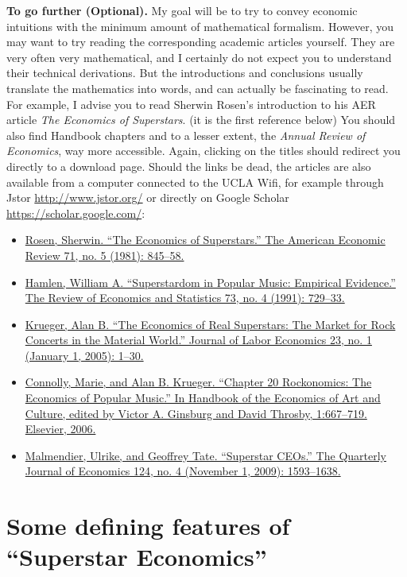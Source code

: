 \documentclass[]{book}
\providecommand{\tightlist}{%
  \setlength{\itemsep}{0pt}\setlength{\parskip}{0pt}}
\theoremstyle{definition}
\theoremstyle{definition}
\theoremstyle{definition}
\theoremstyle{remark}
\begin{document}
\textbf{To go further (Optional).} My goal will be to try to convey
economic intuitions with the minimum amount of mathematical formalism.
However, you may want to try reading the corresponding academic articles
yourself. They are very often very mathematical, and I certainly do not
expect you to understand their technical derivations. But the
introductions and conclusions usually translate the mathematics into
words, and can actually be fascinating to read. For example, I advise
you to read Sherwin Rosen's introduction to his AER article \emph{The
Economics of Superstars}. (it is the first reference below) You should
also find Handbook chapters and to a lesser extent, the \emph{Annual
Review of Economics}, way more accessible. Again, clicking on the titles
should redirect you directly to a download page. Should the links be
dead, the articles are also available from a computer connected to the
UCLA Wifi, for example through Jstor \url{http://www.jstor.org/} or
directly on Google Scholar \url{https://scholar.google.com/}:

\begin{itemize}
\tightlist
\item
  \href{http://www.jstor.org/stable/1803469}{Rosen, Sherwin. ``The
  Economics of Superstars.'' The American Economic Review 71, no. 5
  (1981): 845--58.}
\item
  \href{https://doi.org/10.2307/2109415}{Hamlen, William A.
  ``Superstardom in Popular Music: Empirical Evidence.'' The Review of
  Economics and Statistics 73, no. 4 (1991): 729--33.}
\item
  \href{https://doi.org/10.1086/425431}{Krueger, Alan B. ``The Economics
  of Real Superstars: The Market for Rock Concerts in the Material
  World.'' Journal of Labor Economics 23, no. 1 (January 1, 2005):
  1--30.}
\item
  \href{https://doi.org/10.1016/S1574-0676(06)01020-9}{Connolly, Marie,
  and Alan B. Krueger. ``Chapter 20 Rockonomics: The Economics of
  Popular Music.'' In Handbook of the Economics of Art and Culture,
  edited by Victor A. Ginsburg and David Throsby, 1:667--719. Elsevier,
  2006.}
\item
  \href{https://doi.org/10.1162/qjec.2009.124.4.1593}{Malmendier,
  Ulrike, and Geoffrey Tate. ``Superstar CEOs.'' The Quarterly Journal
  of Economics 124, no. 4 (November 1, 2009): 1593--1638.}
\end{itemize}

\section{\texorpdfstring{Some defining features of ``Superstar
Economics''}{Some defining features of Superstar Economics}}\label{some-defining-features-of-superstar-economics}
\end{document}
